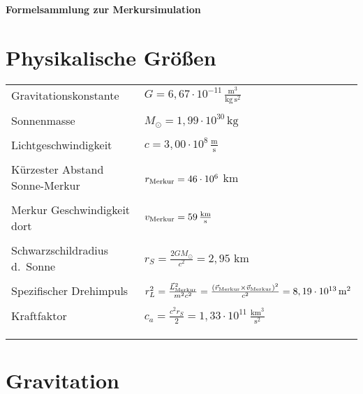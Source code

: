 \documentclass[a4paper, 14pt, fleqn, notitlepage]{scrartcl}
\author{\theauthor}
\title{\vspace{-4em}\thetitle}
\date{\thedate}
\newcommand{\thetitle}{Formelsammlung zur Merkursimulation}
\newcommand{\unit}[1]{\,\text{#1}}
\begin{document}
\sffamily
\pagestyle{empty}

\begin{center}
  \textbf{\textsf{\huge\thetitle}}
\end{center}

\begin{center}
  \color{black!50!white}{\rule{\textwidth}{1pt}}
\end{center}
\vspace{-2.5em}
\section{Physikalische Gr\"o\ss en}

\begin{tabular}{ll}
  Gravitationskonstante & $G = 6,67 \cdot 10^{-11} \, \frac{\text{m}^3}{\text{kg}\,\text{s}^2}$\\
  & \\
  Sonnenmasse & $M_\odot = 1,99 \cdot 10^{30} \unit{kg}$\\
  & \\
  Lichtgeschwindigkeit & $c = 3,00 \cdot 10^{8} \, \frac{\text{m}}{\text{s}}$\\
  & \\
  K\"urzester Abstand Sonne-Merkur & $r_{\rm Merkur}=46\cdot 10^6$ km \\
    & \\
Merkur Geschwindigkeit dort & $v_{\rm Merkur}=59\, \frac{\text{km}}{\text{s}}$ \\
  & \\
  Schwarzschildradius d.\ Sonne & $r_S = \frac{2 G M_\odot}{c^2} = 2,95 \, \unit{km}$\\
  & \\
  Spezifischer Drehimpuls & $r_L^2 = \frac{\vec{L}_{\rm Merkur}^2}{m^2 c^2} = \frac{{(\vec{r}_{\rm Merkur} \times \vec{v}_{\rm Merkur})}^2}{c^2} = 8,19 \cdot 10^{13} \,\text{m}^2$\\
  & \\
  Kraftfaktor & $c_a = \frac{c^2r_S}{2}=1,33\cdot 10^{11} \ \frac{\text{km}^3}{\text{s}^2}$  \\
  & \\[1em]
  \color{black!75!white}{Referenzl\"ange} & \color{black!75!white}{$R_0 = 10^{10} \unit{m} = 10^{7} \unit{km}$}\\
  \color{black!75!white}{Referenzzeit} & \color{black!75!white}{$T_0 = 1 \unit{d}=8,84\cdot 10^4 \unit{s}$}
\end{tabular}

\vspace{1em}
\begin{center}
  \color{black!50!white}{\rule{\textwidth}{1pt}}
\end{center}
\vspace{-1.5em}
\begin{minipage}[t]{1.0\paperwidth}
  \section{Gravitation}
\end{minipage}\\[0.6em]
\end{document}
